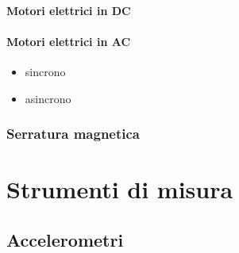\documentclass[letterpaper,10pt,italian]{jupyterBook}
\begin{document}
\subsubsection{Motori elettrici in DC}
\label{\detokenize{ch/electromagnetism/electric-machines:motori-elettrici-in-dc}}\label{\detokenize{ch/electromagnetism/electric-machines:physics-hs-electromagnetism-electric-machines-motor-dc}}

\subsubsection{Motori elettrici in AC}
\label{\detokenize{ch/electromagnetism/electric-machines:motori-elettrici-in-ac}}\label{\detokenize{ch/electromagnetism/electric-machines:physics-hs-electromagnetism-electric-machines-motor-ac}}\begin{itemize}
\item {} 
\sphinxAtStartPar
sincrono

\item {} 
\sphinxAtStartPar
asincrono

\end{itemize}


\subsection{Serratura magnetica}
\label{\detokenize{ch/electromagnetism/electric-machines:serratura-magnetica}}\label{\detokenize{ch/electromagnetism/electric-machines:physics-hs-electromagnetism-electric-machines-lock}}
\sphinxstepscope


\chapter{Strumenti di misura}
\label{\detokenize{ch/electromagnetism/electrical-engineering-instruments:strumenti-di-misura}}\label{\detokenize{ch/electromagnetism/electrical-engineering-instruments:physics-hs-electromagnetism-instruments}}\label{\detokenize{ch/electromagnetism/electrical-engineering-instruments::doc}}

\section{Accelerometri}
\label{\detokenize{ch/electromagnetism/electrical-engineering-instruments:accelerometri}}\label{\detokenize{ch/electromagnetism/electrical-engineering-instruments:physics-hs-electromagnetism-instruments-accelerometer}}
\end{document}

